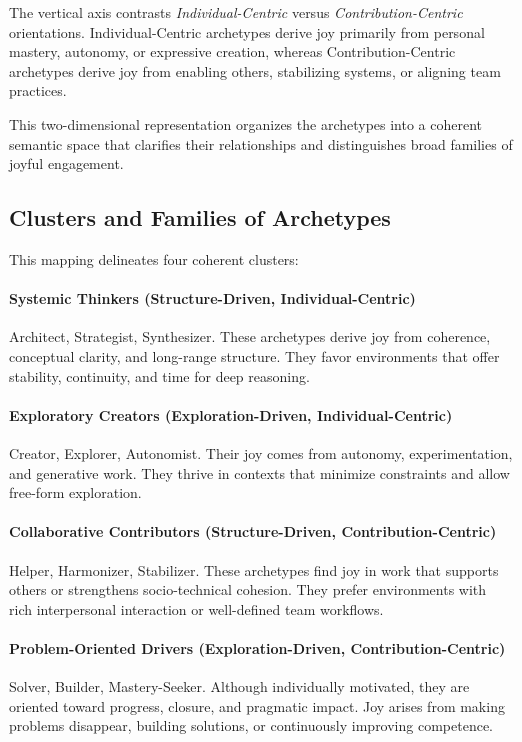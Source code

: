\documentclass[12pt]{elsarticle}
\begin{document}
The vertical axis contrasts \emph{Individual-Centric} versus
\emph{Contribution-Centric} orientations. Individual-Centric archetypes derive
joy primarily from personal mastery, autonomy, or expressive creation,
whereas Contribution-Centric archetypes derive joy from enabling others,
stabilizing systems, or aligning team practices.

This two-dimensional representation organizes the archetypes into a coherent
semantic space that clarifies their relationships and distinguishes broad
families of joyful engagement.

\subsection{Clusters and Families of Archetypes}

This mapping delineates four coherent clusters:
\paragraph{Systemic Thinkers (Structure-Driven, Individual-Centric)}
    Architect, Strategist, Synthesizer.  
    These archetypes derive joy from coherence, conceptual clarity, and
    long-range structure. They favor environments that offer stability,
    continuity, and time for deep reasoning.

\paragraph{Exploratory Creators (Exploration-Driven, Individual-Centric)}
    Creator, Explorer, Autonomist.  
    Their joy comes from autonomy, experimentation, and generative work.
    They thrive in contexts that minimize constraints and allow free-form
    exploration.
    
\paragraph{Collaborative Contributors (Structure-Driven, Contribution-Centric)}
    Helper, Harmonizer, Stabilizer.  
    These archetypes find joy in work that supports others or strengthens
    socio-technical cohesion. They prefer environments with rich
    interpersonal interaction or well-defined team workflows.

\paragraph{Problem-Oriented Drivers (Exploration-Driven, Contribution-Centric)}
    Solver, Builder, Mastery-Seeker.  
    Although individually motivated, they are oriented toward progress,
    closure, and pragmatic impact. Joy arises from making problems disappear, building solutions, or continuously improving competence.
\end{document}
